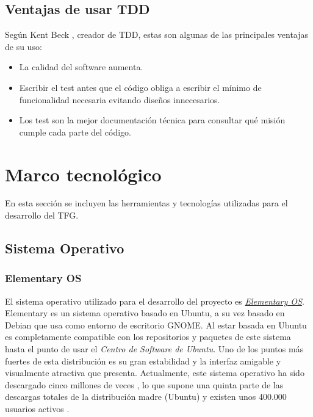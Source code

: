 	\subsection{Ventajas de usar \ac{TDD}}
	Según Kent Beck \cite{Beck04}, creador de TDD, estas son algunas de las principales ventajas de su uso:
	
	\begin{itemize}[label={$\bullet$},labelindent=\parindent,leftmargin=2cm]
		\item La calidad del software aumenta.
		\item Escribir el test antes que el código obliga a escribir el mínimo de funcionalidad necesaria evitando diseños innecesarios.
		\item Los test son la mejor documentación técnica para consultar qué misión cumple cada parte del código.
	\end{itemize}
	

\section{Marco tecnológico}
En esta sección se incluyen las herramientas y tecnologías utilizadas para el desarrollo del \ac{TFG}.

	\subsection{Sistema Operativo}
		\subsubsection{Elementary OS}
			El sistema operativo utilizado para el desarrollo del proyecto es \textit{\href{https://elementary.io/}{Elementary OS}}. Elementary	es un sistema operativo basado en Ubuntu, a su vez basado en Debian que usa como entorno de escritorio \ac{GNOME}. Al estar basada en Ubuntu es completamente compatible con los repositorios y paquetes de este sistema hasta el punto de usar el \textit{Centro de Software de Ubuntu}.
			Uno de los puntos más fuertes de esta distribución es su gran estabilidad y la interfaz amigable y visualmente atractiva que presenta. Actualmente, este sistema operativo ha sido descargado cinco millones de veces \cite{Garc15}, lo que supone una quinta parte de las descargas totales de la distribución madre (Ubuntu) y existen unos 400.000 usuarios activos \cite{Agud15}.	
	
